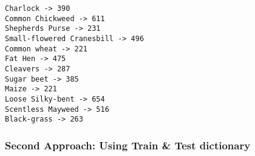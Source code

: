 \documentclass[11pt]{article}
\begin{document}
    \begin{Verbatim}[commandchars=\\\{\}]
Charlock -> 390
Common Chickweed -> 611
Shepherds Purse -> 231
Small-flowered Cranesbill -> 496
Common wheat -> 221
Fat Hen -> 475
Cleavers -> 287
Sugar beet -> 385
Maize -> 221
Loose Silky-bent -> 654
Scentless Mayweed -> 516
Black-grass -> 263

    \end{Verbatim}

    \hypertarget{second-approach-using-train-test-dictionary}{%
\subsubsection{Second Approach: Using Train \& Test
dictionary}\label{second-approach-using-train-test-dictionary}}
\end{document}
